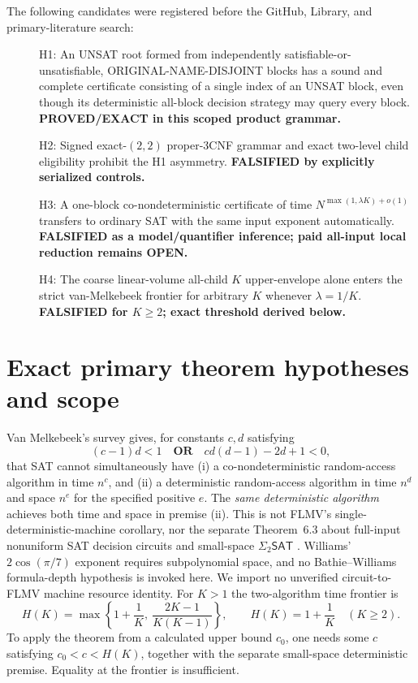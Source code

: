 \documentclass[11pt]{article}
\newcommand{\SAT}{\mathsf{SAT}}
\begin{document}
The following candidates were registered before the GitHub, Library, and primary-literature search:
\begin{description}
\item[] H1: An UNSAT root formed from independently satisfiable-or-unsatisfiable, ORIGINAL-NAME-DISJOINT blocks has a sound and complete certificate consisting of a single index of an UNSAT block, even though its deterministic all-block decision strategy may query every block. \textbf{PROVED/EXACT in this scoped product grammar.}
\item[] H2: Signed exact-$(2,2)$ proper-3CNF grammar and exact two-level child eligibility prohibit the H1 asymmetry. \textbf{FALSIFIED by explicitly serialized controls.}
\item[] H3: A one-block co-nondeterministic certificate of time $N^{\max(1,\lambda K)+o(1)}$ transfers to ordinary SAT with the same input exponent automatically. \textbf{FALSIFIED as a model/quantifier inference; paid all-input local reduction remains OPEN.}
\item[] H4: The coarse linear-volume all-child $K$ upper-envelope alone enters the strict van-Melkebeek frontier for arbitrary $K$ whenever $\lambda=1/K$. \textbf{FALSIFIED for $K\ge2$; exact threshold derived below.}
\end{description}

\section{Exact primary theorem hypotheses and scope}
Van Melkebeek's survey \cite[Theorem~1.3, p.~2]{vm2007} gives, for constants $c,d$ satisfying
\[
(c-1)d<1\quad\mathbf{OR}\quad cd(d-1)-2d+1<0,
\]
that SAT cannot simultaneously have (i) a co-nondeterministic random-access algorithm in time $n^c$, and (ii) a deterministic random-access algorithm in time $n^d$ and space $n^e$ for the specified positive $e$. The \emph{same deterministic algorithm} achieves both time and space in premise (ii). This is not FLMV's single-deterministic-machine corollary, nor the separate Theorem~6.3 about full-input nonuniform SAT decision circuits and small-space $\Sigma_2\SAT$ \cite{vm2007,flmv2005}. Williams' $2\cos(\pi/7)$ exponent requires subpolynomial space, and no Bathie--Williams formula-depth hypothesis is invoked here. We import no unverified circuit-to-FLMV machine resource identity.
For $K>1$ the two-algorithm time frontier is
\[
H(K)=\max\left\{1+\frac1K,\ \frac{2K-1}{K(K-1)}\right\},
\qquad H(K)=1+\frac1K\quad(K\ge2).
\tag{1}
\]
To apply the theorem from a calculated upper bound $c_0$, one needs some $c$ satisfying $c_0<c<H(K)$, together with the separate small-space deterministic premise. Equality at the frontier is insufficient.
\end{document}

